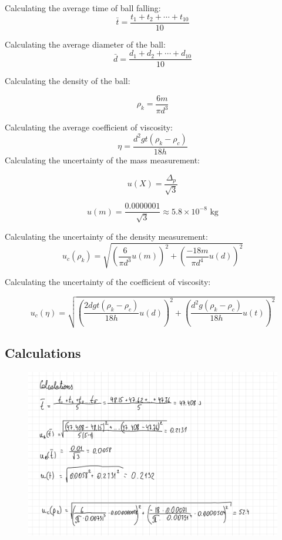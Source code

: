 Calculating the average time of ball falling:
\begin{equation*}
	\bar{t} = \frac{t_1 + t_2 + \cdots + t_{10}}{10}
\end{equation*}

Calculating the average diameter of the ball:
\begin{equation*}
	\bar{d} = \frac{d_1 + d_2 + \cdots + d_{10}}{10}
\end{equation*}


Calculating the density of the ball:

\begin{equation*}
	\rho_k = \frac{6m}{\pi d^3}
\end{equation*}

Calculating the average coefficient of viscosity:
\begin{equation*}
	\eta = \frac{d^2 g t (\rho_k - \rho_c)}{18h}
\end{equation*}
Calculating the uncertainty of the mass measurement:

\begin{equation*}
	u(X) = \frac{\Delta_p}{\sqrt{3}}
\end{equation*}

\begin{equation*}
	u(m) = \frac{0.0000001}{\sqrt{3}} \approx 5.8 \times 10^{-8} \text{ kg}
\end{equation*}

Calculating the uncertainty of the density measurement:
\begin{equation*}
	u_c(\rho_k) = \sqrt{\left(\frac{6}{\pi d^3} u(m)\right)^2 + \left(\frac{-18m}{\pi d^4} u(d)\right)^2}
\end{equation*}

Calculating the uncertainty of the coefficient of viscosity:

\begin{equation*}
	u_c(\eta) = \sqrt{\left(\frac{2dgt(\rho_k-\rho_c)}{18h} u(d)\right)^2 + \left(\frac{d^2 g(\rho_k-\rho_c)}{18h} u(t)\right)^2}
\end{equation*}

\subsection{Calculations}
\begin{figure}[H]
	\centering
	\includegraphics[width=14cm]{schematics/calculations.png}
	
\end{figure}
